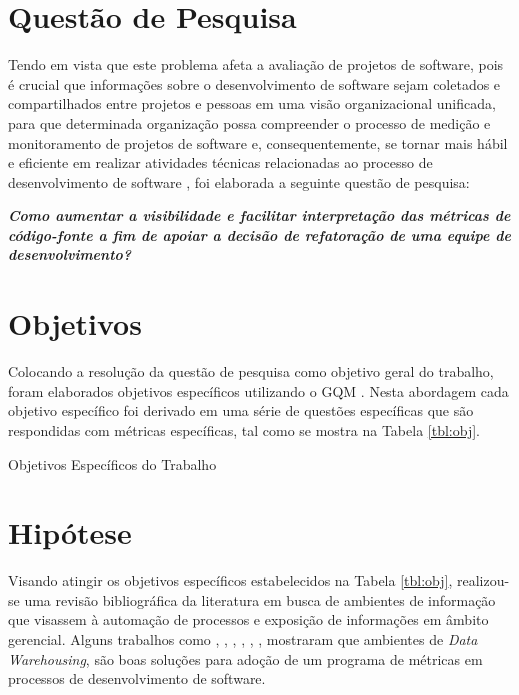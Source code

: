 
\section{Questão de Pesquisa}

Tendo em vista que este problema afeta a avaliação de projetos de software, pois é crucial que informações sobre o desenvolvimento de software sejam coletados e compartilhados entre projetos e pessoas em uma visão organizacional unificada, para que determinada organização possa compreender o processo de medição e monitoramento de projetos de software e, consequentemente, se tornar mais hábil e eficiente em realizar atividades técnicas relacionadas ao processo de desenvolvimento de software \cite{Chulani2003}, foi elaborada a seguinte questão de pesquisa:

\textit{\textbf{Como aumentar a
visibilidade e facilitar interpretação das 
métricas de código-fonte
a fim de apoiar a decisão de refatoração
de uma equipe de desenvolvimento?}}


\section{Objetivos}

Colocando a resolução da questão de pesquisa como objetivo geral do trabalho, foram elaborados objetivos específicos utilizando o GQM \cite{Basili96b}. Nesta abordagem cada objetivo específico foi derivado em uma série de questões específicas que são respondidas com métricas específicas, tal como se mostra na Tabela \ref{tbl:obj}. 

\begin{table}
\centering

\caption{Objetivos Específicos do Trabalho}
\label{tbl:obj} 
\end{table}
\FloatBarrier

\section{Hipótese}

Visando atingir os objetivos específicos estabelecidos na Tabela \ref{tbl:obj}, realizou-se uma revisão bibliográfica da literatura em busca de ambientes de informação que visassem à automação de processos e exposição de informações em âmbito gerencial.
Alguns trabalhos como , , , , , , mostraram que ambientes de \textit{Data Warehousing}, são boas soluções para adoção de um programa de métricas em processos de desenvolvimento de software.

